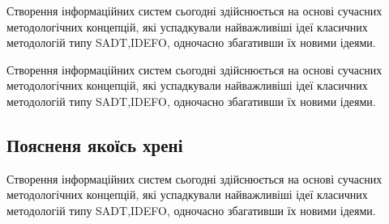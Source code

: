 \documentclass{lib/styles/default-style}
\begin{document}
\pagestyle{default-numbered}

\tableofcontents

\newpage


Створення  інформаційних  систем  сьогодні  здійснюється  
на  основі сучасних  методологічних  концепцій,
які  успадкували  найважливіші  ідеї класичних методологій типу
SADT,IDEFO, одночасно збагативши їх новими ідеями.

Створення  інформаційних  систем  сьогодні  здійснюється  
на  основі сучасних  методологічних  концепцій,
які  успадкували  найважливіші  ідеї класичних методологій типу
SADT,IDEFO, одночасно збагативши їх новими ідеями.

\subsection{Поясненя якоїсь хрені}

Створення  інформаційних  систем  сьогодні  здійснюється  
на  основі сучасних  методологічних  концепцій,
які  успадкували  найважливіші  ідеї класичних методологій типу
SADT,IDEFO, одночасно збагативши їх новими ідеями.
\end{document}
